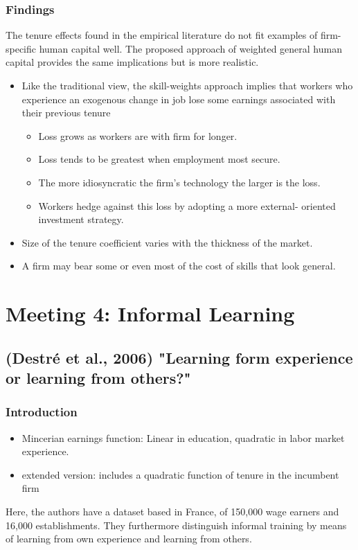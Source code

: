 \documentclass[12pt,a4paper]{article}
\begin{document}
  \subsubsection{Findings}

    The tenure effects found in the empirical literature do not fit examples of firm-specific human capital well. The proposed approach of weighted general human capital provides the same implications but is more realistic.
    \begin{itemize}
      \item Like the traditional view, the skill-weights approach implies that workers who experience an exogenous change in job lose some earnings associated with their previous tenure
        \begin{itemize}
          \item Loss grows as workers are with firm for longer.
          \item Loss tends to be greatest when employment most secure.
          \item The more idiosyncratic the firm's technology the larger is the loss.
          \item Workers hedge against this loss by adopting a more external- oriented investment strategy.
        \end{itemize}
      \item Size of the tenure coefficient varies with the thickness of the market.
      \item A firm may bear some or even most of the cost of skills that look general.
    \end{itemize}

  \section{Meeting 4: Informal Learning} %
  \label{prt:Meeting 4}
  \subsection{(Destré et al., 2006) "Learning form experience or learning from others?"} %
  \label{sec:Destre2006}
  \setcounter{equation}{0}
  \subsubsection{Introduction} %
  \label{ssub:Introduction}
  \begin{itemize}
    \item Mincerian earnings function: Linear in education, quadratic in labor market experience.
    \item extended version: includes a quadratic function of tenure in the incumbent firm
  \end{itemize}
  Here, the authors have a dataset based in France, of 150,000 wage earners and 16,000
  establishments. They furthermore distinguish informal training by means of learning from own
  experience and learning from others.
  
\end{document}
